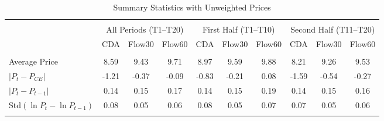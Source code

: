\begin{table}[!htbp] \centering
\caption{Summary Statistics with Unweighted Prices}
\begin{tabular}{@{\extracolsep{5pt}}lccccccccc}
\\[-1.8ex]\hline
\hline \\[-1.8ex]
 & \multicolumn{3}{c}{All Periods (T1--T20)} & \multicolumn{3}{c}{First Half (T1--T10)} & \multicolumn{3}{c}{Second Half (T11--T20)} \\
 & CDA & Flow30 & Flow60 & CDA & Flow30 & Flow60 & CDA & Flow30 & Flow60 \\
\hline \\[-1.8ex]
 Average Price & 8.59 & 9.43 & 9.71 & 8.97 & 9.59 & 9.88 & 8.21 & 9.26 & 9.53 \\
 $|P_t - P_{CE}|$ & -1.21 & -0.37 & -0.09 & -0.83 & -0.21 & 0.08 & -1.59 & -0.54 & -0.27 \\
 $|P_t - P_{t-1}|$ & 0.14 & 0.15 & 0.17 & 0.14 & 0.15 & 0.19 & 0.14 & 0.15 & 0.16 \\
 Std$(\ln P_t - \ln P_{t-1})$ & 0.08 & 0.05 & 0.06 & 0.08 & 0.05 & 0.07 & 0.07 & 0.05 & 0.06 \\
\hline
\hline \\[-1.8ex]
\end{tabular}
\end{table}